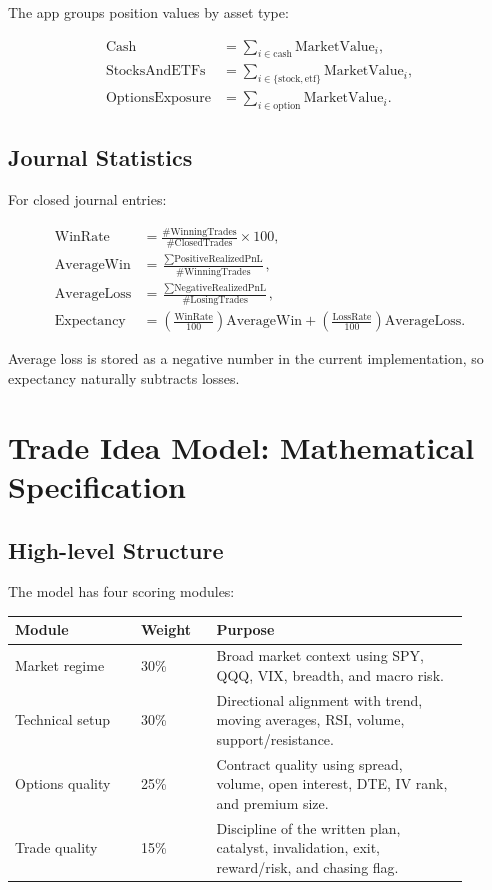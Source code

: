 \documentclass[11pt]{article}
\begin{document}
The app groups position values by asset type:

\begin{align}
\text{Cash} &= \sum_{i \in \text{cash}} \text{MarketValue}_i, \\
\text{StocksAndETFs} &= \sum_{i \in \{\text{stock}, \text{etf}\}} \text{MarketValue}_i, \\
\text{OptionsExposure} &= \sum_{i \in \text{option}} \text{MarketValue}_i.
\end{align}

\subsection{Journal Statistics}

For closed journal entries:

\begin{align}
\text{WinRate} &= \frac{\#\text{WinningTrades}}{\#\text{ClosedTrades}} \times 100, \\
\text{AverageWin} &= \frac{\sum \text{PositiveRealizedPnL}}{\#\text{WinningTrades}}, \\
\text{AverageLoss} &= \frac{\sum \text{NegativeRealizedPnL}}{\#\text{LosingTrades}}, \\
\text{Expectancy} &= \left(\frac{\text{WinRate}}{100}\right)\text{AverageWin}
 + \left(\frac{\text{LossRate}}{100}\right)\text{AverageLoss}.
\end{align}

Average loss is stored as a negative number in the current implementation, so expectancy naturally subtracts losses.

\section{Trade Idea Model: Mathematical Specification}

\subsection{High-level Structure}

The model has four scoring modules:

\begin{longtable}{p{0.25\linewidth} p{0.15\linewidth} p{0.50\linewidth}}
\toprule
\textbf{Module} & \textbf{Weight} & \textbf{Purpose} \\
\midrule
Market regime & 30\% & Broad market context using SPY, QQQ, VIX, breadth, and macro risk. \\
Technical setup & 30\% & Directional alignment with trend, moving averages, RSI, volume, support/resistance. \\
Options quality & 25\% & Contract quality using spread, volume, open interest, DTE, IV rank, and premium size. \\
Trade quality & 15\% & Discipline of the written plan, catalyst, invalidation, exit, reward/risk, and chasing flag. \\
\bottomrule
\end{longtable}
\end{document}

